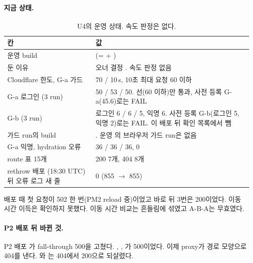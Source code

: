 \paragraph{지금 상태.}
\begin{table}[H]
  \caption{U4의 운영 상태. 속도 판정은 없다.}
  \label{tab:cc3-u4-now}
  \centering\small
  \begin{tabularx}{\linewidth}{@{}Y L{4.6cm}@{}}
    \toprule
    칸 & 값 \\
    \midrule
    운영 build &  (=  + ) \\
    \midrule
    둔 이유 & 오너 결정 . 속도 판정 없음 \\
    \midrule
    Cloudflare 한도, G-a 가드 & 70 / 10\,s, 10초 최대 요청 60 이하 \\
    \midrule
    G-a 로그인 (3 run) & 50 / 53 / 50.  선(60 이하)만 통과, 사전 등록 G-a(45.6)로는 FAIL \\
    \midrule
    G-b (3 run) & 로그인 6 / 6 / 5, 익명 6. 사전 등록 G-b(로그인 5, 익명 2)로는 FAIL. 이 배포 뒤 확인 목록에서 뺌 \\
    \midrule
    가드 run의 build & . 운영 의 브라우저 가드 run은 없음 \\
    \midrule
    G-a 익명, hydration 오류 & 36 / 36 / 36, 0 \\
    \midrule
    route 표 15개 & 200 7개, 404 8개 \\
    \midrule
    rethrow 배포 (18:30 UTC) 뒤 오류 로그 새 줄 & 0 (855 $\to$ 855) \\
    \bottomrule
  \end{tabularx}
\end{table}
배포 때 \code{/} 첫 요청이 502 한 번(PM2 reload 중)이었고 바로 뒤 3번은 200이었다.
이동 시간 이득은 확인하지 못했다. 이동 시간 비교는 흔들림에 섞였고 A-B-A는 무효였다.

\paragraph{P2 배포 뒤 바뀐 것.}
P2 배포 가 fall-through 500을 고쳤다. , , 가 500이었다.
이제 proxy가 경로 모양으로 404를 낸다. 와 는 404에서 200으로 되살렸다.

